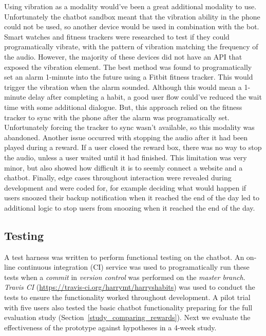 Using vibration as a modality would've been a great additional modality to use.
Unfortunately the chatbot sandbox meant that the vibration ability in the phone could not be used, so another device would be used in combination with the bot.
Smart watches and fitness trackers were researched to test if they could programatically vibrate, with the pattern of vibration matching the frequency of the audio.
However, the majority of these devices did not have an API that exposed the vibration element. The best method was found to programatically set an alarm 1-minute into the future using a Fitbit fitness tracker.
This would trigger the vibration when the alarm sounded.
Although this would mean a 1-minute delay after completing a habit, a good user flow could've reduced the wait time with some additional dialogue.
But, this approach relied on the fitness tracker to sync with the phone after the alarm was programatically set. Unfortunately forcing the tracker to sync wasn't available, so this modality was abandoned. Another issue occurred with stopping the audio after it had been played during a reward. If a user closed the reward box, there was no way to stop the audio, unless a user waited until it had finished. This limitation was very minor, but also showed how difficult it is to seemly connect a website and a chatbot. Finally, edge cases throughout interaction were revealed during development and were coded for, for example deciding what would happen if users snoozed their backup notification when it reached the end of the day led to additional logic to stop users from snoozing when it reached the end of the day.


\subsection{Testing}
A test harness was written to perform functional testing on the chatbot. An on-line continuous integration (CI) service was used to programatically run these tests when a \textit{commit} in \textit{version control} was performed on the \textit{master branch}. \textit{Travis CI} (\url{https://travis-ci.org/harrymt/harryshabits}) was used to conduct the tests to ensure the functionality worked throughout development. A pilot trial with five users also tested the basic chatbot functionality preparing for the full evaluation study (Section~\ref{study_comparing_rewards}). Next we evaluate the effectiveness of the prototype against hypotheses in a 4-week study.

\newpage